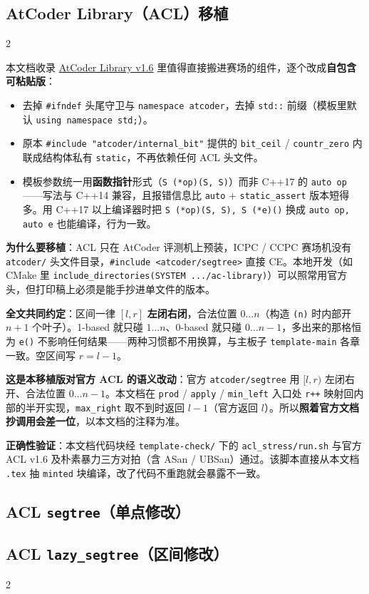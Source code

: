 	\begin{center}
		\section{AtCoder Library（ACL）移植}
	\end{center}

		\begin{multicols*}{2}

		本文档收录 \href{https://github.com/atcoder/ac-library}{AtCoder Library v1.6} 里值得直接搬进赛场的组件，逐个改成\textbf{自包含可粘贴版}：

		\begin{itemize}
			\item 去掉 \texttt{\#ifndef} 头尾守卫与 \texttt{namespace atcoder}，去掉 \texttt{std::} 前缀（模板里默认 \texttt{using namespace std;}）。
			\item 原本 \texttt{\#include "atcoder/internal\_bit"} 提供的 \texttt{bit\_ceil} / \texttt{countr\_zero} 内联成结构体私有 \texttt{static}，不再依赖任何 ACL 头文件。
			\item 模板参数统一用\textbf{函数指针}形式（\texttt{S (*op)(S, S)}）而非 C++17 的 \texttt{auto op}——写法与 C++14 兼容，且报错信息比 \texttt{auto} + \texttt{static\_assert} 版本短得多。用 C++17 以上编译器时把 \texttt{S (*op)(S, S), S (*e)()} 换成 \texttt{auto op, auto e} 也能编译，行为一致。
		\end{itemize}

		\textbf{为什么要移植}：ACL 只在 AtCoder 评测机上预装，ICPC / CCPC 赛场机没有 \texttt{atcoder/} 头文件目录，\texttt{\#include <atcoder/segtree>} 直接 CE。本地开发（如 CMake 里 \texttt{include\_directories(SYSTEM .../ac-library)}）可以照常用官方头，但打印稿上必须是能手抄进单文件的版本。

		\textbf{全文共同约定}：区间一律 $[l, r]$ \textbf{左闭右闭}，合法位置 $0 \dots n$（构造 \texttt{(n)} 时内部开 $n+1$ 个叶子）。1-based 就只碰 $1 \dots n$、0-based 就只碰 $0 \dots n-1$，多出来的那格恒为 \texttt{e()} 不影响任何结果——两种习惯都不用换算，与主板子 \texttt{template-main} 各章一致。空区间写 $r = l - 1$。

		\textbf{这是本移植版对官方 ACL 的语义改动}：官方 \texttt{atcoder/segtree} 用 $[l, r)$ 左闭右开、合法位置 $0 \dots n-1$。本文档在 \texttt{prod} / \texttt{apply} / \texttt{min\_left} 入口处 \texttt{r++} 映射回内部的半开实现，\texttt{max\_right} 取不到时返回 $l - 1$（官方返回 $l$）。所以\textbf{照着官方文档抄调用会差一位}，以本文档的注释为准。

			\textbf{正确性验证}：本文档代码块经 \texttt{template-check/} 下的 \texttt{acl\_stress/run.sh} 与官方 ACL v1.6 及朴素暴力三方对拍（含 ASan / UBSan）通过。该脚本直接从本文档 \texttt{.tex} 抽 \texttt{minted} 块编译，改了代码不重跑就会暴露不一致。

		\end{multicols*}

		\subsection{ACL \texttt{segtree}（单点修改）}
		

		\subsection{ACL \texttt{lazy\_segtree}（区间修改）}
		

		\begin{multicols*}{2}
			
		\end{multicols*}
